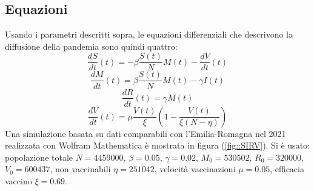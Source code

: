 \documentclass{article}
\begin{document}
\subsection{Equazioni}
Usando i parametri descritti sopra, le equazioni differenziali che 
descrivono la diffusione della pandemia sono quindi quattro:\\
\begin{equation} \label{eq::S}
\frac{dS}{dt}(t)= -\beta \frac{S(t)}{N}M(t) - \frac{dV}{dt}(t)
\end{equation}
\begin{equation}\label{eq::M}
\frac{dM}{dt}(t)= \beta \frac{S(t)}{N}M(t) - \gamma I(t)
\end{equation}
\begin{equation}\label{eq::R}
\frac{dR}{dt}(t)= \gamma M(t)
\end{equation}
\begin{equation}\label{eq::V}
\frac{dV}{dt}(t)= \mu\frac{V(t)}{\xi}\left( 1-\frac{V(t)}{\xi(N-\eta)}\right)
\end{equation}
Una simulazione basata su dati comparabili con l'Emilia-Romagna nel 2021
realizzata con Wolfram Mathematica è mostrata in figura 
(\ref{fig::SIRV}). 
Si è usato: popolazione totale $N=4459000$, $\beta=0.05$, 
$\gamma=0.02$, $M_0 = 530502$, $R_0 = 320000$, $V_0 = 600437$,
non vaccinabili $\eta = 251042$, 
velocità vaccinazioni $\mu = 0.05$, efficacia 
vaccino $\xi= 0.69$.
\end{document}
